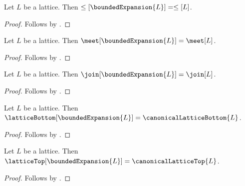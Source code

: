 \begin{proposition}\label{bounded_expansion_order}
    Let $L$ be a lattice.
    Then $\leq[\boundedExpansion{L}]=\leq[L]$.
\end{proposition}
\begin{proof}
    Follows by
        .
\end{proof}

\begin{proposition}\label{bounded_expansion_meet}
    Let $L$ be a lattice.
    Then $\meet[\boundedExpansion{L}]=\meet[L]$.
\end{proposition}
\begin{proof}
    Follows by
        .
\end{proof}

\begin{proposition}\label{bounded_expansion_join}
    Let $L$ be a lattice.
    Then $\join[\boundedExpansion{L}]=\join[L]$.
\end{proposition}
\begin{proof}
    Follows by
        .
\end{proof}

\begin{proposition}\label{bounded_expansion_bottom}
    Let $L$ be a lattice.
    Then $\latticeBottom[\boundedExpansion{L}]
        =\canonicalLatticeBottom{L}$.
\end{proposition}
\begin{proof}
    Follows by
        .
\end{proof}

\begin{proposition}\label{bounded_expansion_top}
    Let $L$ be a lattice.
    Then $\latticeTop[\boundedExpansion{L}]
        =\canonicalLatticeTop{L}$.
\end{proposition}
\begin{proof}
    Follows by
        .
\end{proof}

